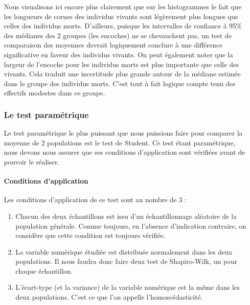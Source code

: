 \documentclass[a4paperpaper,]{article}
\providecommand{\tightlist}{%
  \setlength{\itemsep}{0pt}\setlength{\parskip}{0pt}}
\let\oldparagraph\paragraph
\renewcommand{\paragraph}[1]{\oldparagraph{#1}\mbox{}}
\begin{document}
Nous visualisons ici encore plus clairement que sur les histogrammes le fait que les longueurs de cornes des individus vivants sont légèrement plus longues que celles des individus morts. D'ailleurs, puisque les intervalles de confiance à 95\% des médianes des 2 groupes (les encoches) ne se chevauchent pas, un test de comparaison des moyennes devrait logiquement conclure à une différence significative en faveur des individus vivants. On peut également noter que la largeur de l'encoche pour les individus morts est plus importante que celle des vivants. Cela traduit une incertitude plus grande autour de la médiane estimée dans le groupe des individus morts. C'est tout à fait logique compte tenu des effectifs modestes dans ce groupe.

\hypertarget{le-test-parametrique-2}{%
\subsubsection{Le test paramétrique}\label{le-test-parametrique-2}}

Le test paramétrique le plus puissant que nous puissions faire pour comparer la moyenne de 2 populations est le test de Student. Ce test étant paramétrique, nous devons nous assurer que ses conditions d'application sont vérifiées avant de pouvoir le réaliser.

\hypertarget{conditions-dapplication-2}{%
\paragraph{Conditions d'application}\label{conditions-dapplication-2}}

Les conditions d'application de ce test sont au nombre de 3 :

\begin{enumerate}
\def\labelenumi{\arabic{enumi}.}
\tightlist
\item
  Chacun des deux échantillons est issu d'un échantillonnage aléatoire de la population générale. Comme toujours, en l'absence d'indication contraire, on considère que cette condition est toujours vérifiée.
\item
  La variable numérique étudiée est distribuée normalement dans les deux populations. Il nous faudra donc faire deux test de Shapiro-Wilk, un pour chaque échantillon.
\item
  L'écart-type (et la variance) de la variable numérique est la même dans les deux populations. C'est ce que l'on appelle l'homoscédasticité.
\end{enumerate}
\end{document}
